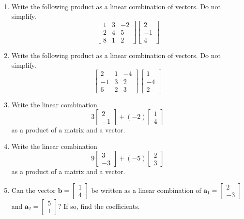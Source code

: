 \documentclass[
]{book}
\theoremstyle{definition}
\theoremstyle{definition}
\theoremstyle{definition}
\theoremstyle{definition}
\theoremstyle{remark}
\begin{document}
\begin{enumerate}
\item
  Write the following product as a linear combination of vectors. Do not simplify.
  \[\begin{bmatrix} 1 & 3 & -2 \\2 & 4 & 5\\8& 1 & 2\end{bmatrix} \begin{bmatrix} 2\\-1\\4\end{bmatrix}\]
\item
  Write the following product as a linear combination of vectors. Do not simplify.
  \[\begin{bmatrix} 2 & 1 & -4 \\-1 & 3 & 2\\ 6 & 2 & 3\end{bmatrix} \begin{bmatrix} 1\\-4\\2\end{bmatrix}\]
\item
  Write the linear combination
  \[3\begin{bmatrix} 2\\-1\end{bmatrix}+(-2)\begin{bmatrix}1\\4\end{bmatrix}\]
  as a product of a matrix and a vector.
\item
  Write the linear combination
  \[9\begin{bmatrix} 3\\-3\end{bmatrix}+(-5)\begin{bmatrix}2\\3\end{bmatrix}\]
  as a product of a matrix and a vector.
\item
  Can the vector \(\mathbf{b}=\begin{bmatrix}1\\4\end{bmatrix}\) be written as a linear combination of \(\mathbf{a}_1=\begin{bmatrix}2\\-3\end{bmatrix}\) and \(\mathbf{a}_2=\begin{bmatrix}5\\1\end{bmatrix}?\) If so, find the coefficients.

\end{enumerate}
\end{document}
